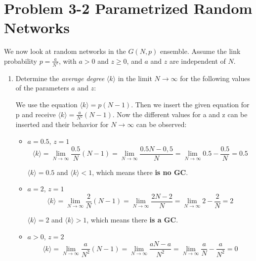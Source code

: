\section{Problem 3-2 Parametrized Random Networks}

We now look at random networks in the $G(N,p)$ ensemble. Assume the link probability $p = \frac{a}{N^z}$, with $a > 0$ and $z \geq 0$, and $a$ and $z$ are independent of $N$.

\begin{enumerate}
	\item Determine the \textit{average degree} $\langle k \rangle$ in the limit $N \rightarrow \infty$ for the following values of the parameters $a$ and $z$:

	We use the equation $\langle k \rangle = p(N-1)$. Then we insert the given equation for p and receive $\langle k \rangle = \frac{a}{N^z} (N-1)$. Now the different values for a and z can be inserted and their behavior for $N \rightarrow \infty$ can be observed:
	
	\begin{itemize}
		\item $a=0.5$,  $z=1$
			\begin{equation}
				\langle k \rangle = \lim\limits_{N \rightarrow \infty} \frac{0.5}{N}(N-1) = \lim\limits_{N \rightarrow \infty} \frac{0.5N - 0,5}{N} =\lim\limits_{N \rightarrow \infty} 0.5 - \frac{0.5}{N} = 0.5
			\end{equation}
			
			$\langle k \rangle = 0.5$ and $\langle k \rangle < 1$, which means there \textbf{is no GC}. 
		\item $a=2$,  $z=1$
			\begin{equation}
				\langle k \rangle = \lim\limits_{N \rightarrow \infty} \frac{2}{N}(N-1) = \lim\limits_{N \rightarrow \infty} \frac{2N - 2}{N} =\lim\limits_{N \rightarrow \infty} 2 - \frac{2}{N} = 2
			\end{equation}
			
			$\langle k \rangle = 2$ and $\langle k \rangle > 1$, which means there \textbf{is a GC}. 
		\item $a>0$,  $z=2$
			\begin{equation}
				\langle k \rangle = \lim\limits_{N \rightarrow \infty} \frac{a}{N^2}(N-1) = \lim\limits_{N \rightarrow \infty} \frac{aN - a}{N^2} =\lim\limits_{N \rightarrow \infty} \frac{a}{N} - \frac{a}{N^2} = 0
			\end{equation}
			

\end{itemize}
\end{enumerate}
